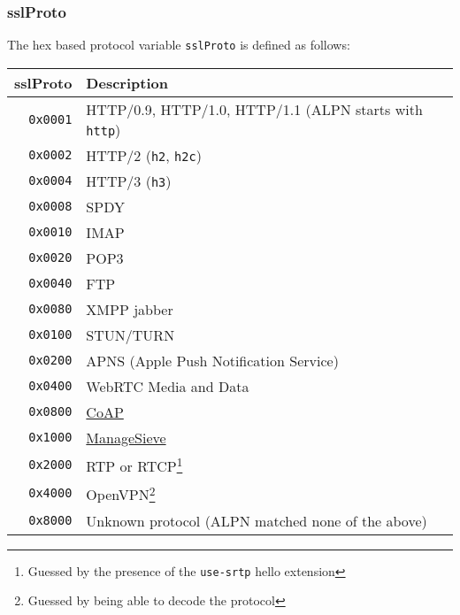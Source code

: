 \documentclass[documentation]{subfiles}
\begin{document}
\subsubsection{sslProto}\label{sslProto}
The hex based protocol variable {\tt sslProto} is defined as follows:
\begin{longtable}{rl}
    \toprule
    {\bf sslProto} & {\bf Description} \\
    \midrule\endhead%
    {\tt 0x0001} & HTTP/0.9, HTTP/1.0, HTTP/1.1 (ALPN starts with {\tt http})\\
    {\tt 0x0002} & HTTP/2 ({\tt h2}, {\tt h2c})\\
    {\tt 0x0004} & HTTP/3 ({\tt h3})\\
    {\tt 0x0008} & SPDY \\
    {\tt 0x0010} & IMAP \\
    {\tt 0x0020} & POP3 \\
    {\tt 0x0040} & FTP \\
    {\tt 0x0080} & XMPP jabber \\
    {\tt 0x0100} & STUN/TURN \\
    {\tt 0x0200} & APNS (Apple Push Notification Service) \\
    {\tt 0x0400} & WebRTC Media and Data \\
    {\tt 0x0800} & \href{https://tools.ietf.org/html/rfc8323}{CoAP} \\
    {\tt 0x1000} & \href{https://tools.ietf.org/html/rfc5804}{ManageSieve} \\
    {\tt 0x2000} & RTP or RTCP\footnote{Guessed by the presence of the {\tt use-srtp} hello extension}\\
    {\tt 0x4000} & OpenVPN\footnote{Guessed by being able to decode the protocol}\\
    {\tt 0x8000} & Unknown protocol (ALPN matched none of the above)\\
    \bottomrule
\end{longtable}
\end{document}
